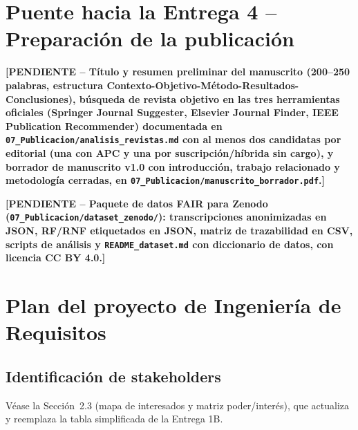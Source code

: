 \documentclass[11pt,a4paper]{article}
\newcommand{\PENDIENTE}[1]{\textcolor{pendiente}{\textbf{[PENDIENTE -- #1]}}}
\begin{document}
\section{Puente hacia la Entrega 4 -- Preparación de la publicación}
\PENDIENTE{Título y resumen preliminar del manuscrito (200--250 palabras, estructura Contexto-Objetivo-Método-Resultados-Conclusiones), búsqueda de revista objetivo en las tres herramientas oficiales (Springer Journal Suggester, Elsevier Journal Finder, IEEE Publication Recommender) documentada en \texttt{07\_Publicacion/analisis\_revistas.md} con al menos dos candidatas por editorial (una con APC y una por suscripción/híbrida sin cargo), y borrador de manuscrito v1.0 con introducción, trabajo relacionado y metodología cerradas, en \texttt{07\_Publicacion/manuscrito\_borrador.pdf}.}

\PENDIENTE{Paquete de datos FAIR para Zenodo (\texttt{07\_Publicacion/dataset\_zenodo/}): transcripciones anonimizadas en JSON, RF/RNF etiquetados en JSON, matriz de trazabilidad en CSV, scripts de análisis y \texttt{README\_dataset.md} con diccionario de datos, con licencia CC BY 4.0.}

\appendix
\section{Plan del proyecto de Ingeniería de Requisitos}
\subsection{Identificación de stakeholders}
Véase la Sección~2.3 (mapa de interesados y matriz poder/interés), que actualiza y reemplaza la tabla simplificada de la Entrega 1B.
\end{document}
